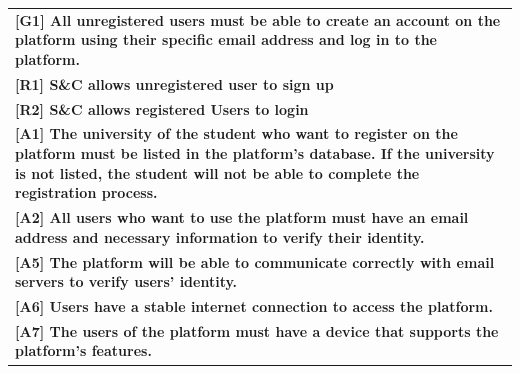 \begin{center}
    \begin{tabular}{|p{37em}|}
        \rowcolor{bluepoli!40} %
        \hline
        \textbf{[G1] All unregistered users must be able to create an account on the platform using their
        specific email address and log in to the platform.} \\
        \rowcolor{bluepoli!15}
        \textbf{[R1] S\&C allows unregistered user to sign up}\\
        \rowcolor{bluepoli!15}
        \textbf{[R2] S\&C allows registered Users to login} \\
        \textbf{[A1] The university of the student who want to register on the platform must be listed in the platform's database. If the university is not listed, the student
        will not be able to complete the registration process.} \\
        \textbf{[A2] All users who want to use the platform must have an email address and necessary information to verify their identity.} \\
        \textbf{[A5] The platform will be able to communicate correctly with email servers to verify users' identity.}\\
        \textbf{[A6] Users have a stable internet connection to access the platform.}\\
        \textbf{[A7] The users of the platform must have a device that supports the platform's features.}\\
        \hline
    \end{tabular}
\end{center}

